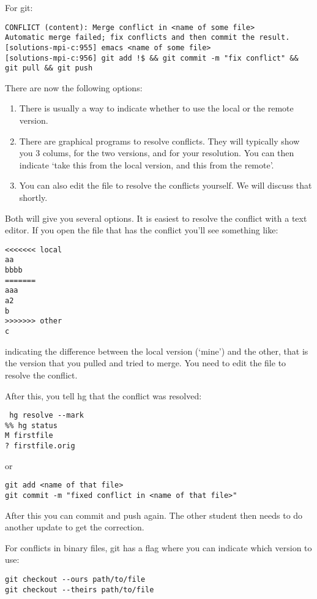 For git:
\begin{verbatim}
CONFLICT (content): Merge conflict in <name of some file>
Automatic merge failed; fix conflicts and then commit the result.
[solutions-mpi-c:955] emacs <name of some file>
[solutions-mpi-c:956] git add !$ && git commit -m "fix conflict" && git pull && git push
\end{verbatim}

There are now the following options:
\begin{enumerate}
\item There is usually a way to indicate whether to use the local or
  the remote version.
\item There are graphical programs to resolve conflicts. They will
  typically show you 3 colums, for the two versions, and for your
  resolution. You can then indicate `take this from the local version,
  and this from the remote'.
\item You can also edit the file to resolve the conflicts yourself. We
  will discuss that shortly.
\end{enumerate}

Both  will give you several options. It is easiest to resolve the
conflict with a text editor. If you open the file that has the conflict
you'll see something like:
\begin{verbatim}
<<<<<<< local
aa
bbbb
=======
aaa
a2
b
>>>>>>> other
c
\end{verbatim}
indicating the difference between the local version (`mine') and the
other, that is the version that you pulled and tried to merge.
You need to edit the file to resolve the conflict.

After this, you tell hg that the conflict was resolved:
\begin{verbatim}
 hg resolve --mark
%% hg status
M firstfile
? firstfile.orig
\end{verbatim}
or
\begin{verbatim}
git add <name of that file>
git commit -m "fixed conflict in <name of that file>"
\end{verbatim}
After this you can commit and push again.
The other student then needs to do another update to get the
correction.

For conflicts in binary files, git has a flag where you can indicate
which version to use:
\begin{verbatim}
git checkout --ours path/to/file
git checkout --theirs path/to/file
\end{verbatim}

